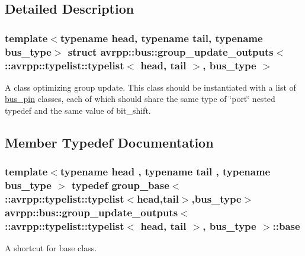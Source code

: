 \subsection{Detailed Description}
\subsubsection*{template$<$typename head, typename tail, typename bus\_\-type$>$ struct avrpp::bus::group\_\-update\_\-outputs$<$ ::avrpp::typelist::typelist$<$ head, tail $>$, bus\_\-type $>$}

A class optimizing group update. This class should be instantiated with a list of \hyperlink{structavrpp_1_1bus_1_1bus__pin}{bus\_\-pin} classes, each of which should share the same type of \char`\"{}port\char`\"{} nested typedef and the same value of bit\_\-shift. 

\subsection{Member Typedef Documentation}
\hypertarget{structavrpp_1_1bus_1_1group__update__outputs_3_01_1_1avrpp_1_1typelist_1_1typelist_3_01head_00_01tail_01_4_00_01bus__type_01_4_a2e4c9b090dc3b40c81ec396316d7553e}{
\subsubsection[{base}]{\setlength{\rightskip}{0pt plus 5cm}template$<$typename head , typename tail , typename bus\_\-type $>$ typedef group\_\-base$<$ ::{\bf avrpp::typelist::typelist}$<$head,tail$>$,bus\_\-type$>$ avrpp::bus::group\_\-update\_\-outputs$<$ ::{\bf avrpp::typelist::typelist}$<$ head, tail $>$, bus\_\-type $>$::{\bf base}}}
\label{structavrpp_1_1bus_1_1group__update__outputs_3_01_1_1avrpp_1_1typelist_1_1typelist_3_01head_00_01tail_01_4_00_01bus__type_01_4_a2e4c9b090dc3b40c81ec396316d7553e}


A shortcut for base class. 

